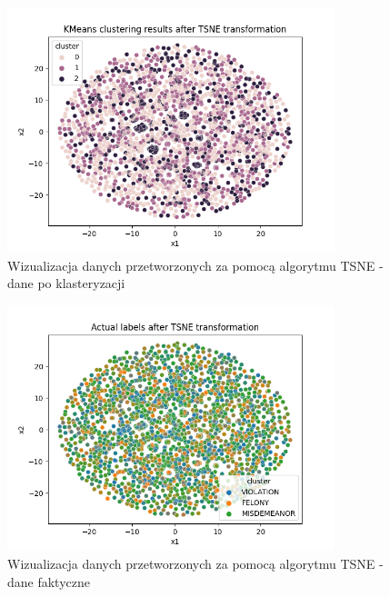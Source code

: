 \documentclass{classrep}
\begin{document}
{{{                 \begin{figure}[!htbp]
                    \centering
                    \includegraphics[width=0.85\textwidth]{img/clustering/tsne_crime_codes_clusters.png}
                    \caption{Wizualizacja danych przetworzonych za pomocą algorytmu TSNE - dane po klasteryzacji}
                    \label{tsne_clusters}
                \end{figure}
                \FloatBarrier
                
                \begin{figure}[!htbp]
                    \centering
                    \includegraphics[width=0.85\textwidth]{img/clustering/tsne_crime_codes_actual.png}
                    \caption{Wizualizacja danych przetworzonych za pomocą algorytmu TSNE - dane faktyczne}
                    \label{tsne_actual}
                \end{figure}
                \FloatBarrier
                
}}}
\end{document}
